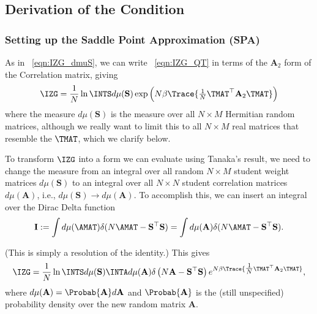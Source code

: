 \subsection{Derivation of the \TRACELOG Condition}
\label{sxn:TraceLogDerivation}

\subsubsection{Setting up the Saddle Point Approximation (SPA)}
\label{sxn:TraceLogDerivation_A}

As in \EQN~\ref{eqn:IZG_dmuS}, 
we can write \EQN~\ref{eqn:IZG_QT} in terms of the $\mathbf{A}_{2}$ form of the \Student Correlation matrix, 
giving
\begin{align}
\IZG = \frac{1}{N}\ln\INTS d\mu(\mathbf{S}) \exp\left(N\beta \Trace{ \tfrac{1}{N}\TMAT^{\top} \mathbf{A}_{2} \TMAT } \right)
\end{align}
where the measure $d\mu(\mathbf{S})$ is the measure over all $N \times M$ Hermitian random matrices,
although we really want to limit this to all $N \times M$ real matrices that resemble the \Teacher $\TMAT$,
which we clarify below.

To transform $\IZG$ into a form we can evaluate using Tanaka's result, 
we need to change the measure from an integral over all random $N \times M$ student weight matrices
$d\mu(\mathbf{S})$ to an integral over all $N \times N$
student correlation matrices $d\mu(\mathbf{A})$, i.e., $d\mu(\mathbf{S})\rightarrow d\mu(\mathbf{A})$.
To accomplish this, we can insert an integral over the Dirac Delta function
\begin{align}
  \label{eqn:I}
  \mathbf{I}:=\int d\mu(\AMAT)\delta(N\AMAT-\mathbf{S}^{\top}\mathbf{S})=\int d\mu(\mathbf{A})\delta(N\AMAT-\mathbf{S}^{\top}\mathbf{S})  .
\end{align}

\noindent
(This is simply a resolution of the identity.)
This gives
\begin{align}
\label{eqn:IZG_3}
\IZG= \frac{1}{N} \ln \INTS d\mu(\mathbf{S})\INTA d\mu(\mathbf{A})
           \delta\left( N\mathbf{A}-\mathbf{S}^{\top}\mathbf{S} \right) 
           e^{ N\beta \Trace{ \tfrac{1}{N} \TMAT^{\top} \mathbf{A}_{2}\TMAT } } ,
\end{align}
where $d\mu(\mathbf{A})=\Probab{\mathbf{A}}d\mathbf{A}$ and $\Probab{\mathbf{A}}$ is the
(still unspecified) probability density over the new random matrix $\mathbf{A}$. 
%

